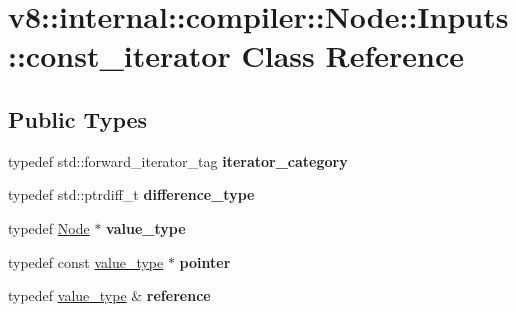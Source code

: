 \hypertarget{classv8_1_1internal_1_1compiler_1_1Node_1_1Inputs_1_1const__iterator}{}\section{v8\+:\+:internal\+:\+:compiler\+:\+:Node\+:\+:Inputs\+:\+:const\+\_\+iterator Class Reference}
\label{classv8_1_1internal_1_1compiler_1_1Node_1_1Inputs_1_1const__iterator}
\subsection*{Public Types}
\begin{DoxyCompactItemize}
\item 
\mbox{\label{classv8_1_1internal_1_1compiler_1_1Node_1_1Inputs_1_1const__iterator_a76e0b1f409d6068bee5c403628a87095}} 
typedef std\+::forward\+\_\+iterator\+\_\+tag {\bfseries iterator\+\_\+category}
\item 
\mbox{\label{classv8_1_1internal_1_1compiler_1_1Node_1_1Inputs_1_1const__iterator_aaa79e84ef5c20000047cb671e9ee5b75}} 
typedef std\+::ptrdiff\+\_\+t {\bfseries difference\+\_\+type}
\item 
\mbox{\label{classv8_1_1internal_1_1compiler_1_1Node_1_1Inputs_1_1const__iterator_a329d627c41e3f33033bebfcbc421dda0}} 
typedef \mbox{\hyperlink{classv8_1_1internal_1_1compiler_1_1Node}{Node}} $\ast$ {\bfseries value\+\_\+type}
\item 
\mbox{\label{classv8_1_1internal_1_1compiler_1_1Node_1_1Inputs_1_1const__iterator_a42c2863ca701aaf7ae07a40de0610761}} 
typedef const \mbox{\hyperlink{classv8_1_1internal_1_1compiler_1_1Node}{value\+\_\+type}} $\ast$ {\bfseries pointer}
\item 
\mbox{\label{classv8_1_1internal_1_1compiler_1_1Node_1_1Inputs_1_1const__iterator_aac1f1498d11bcb3ffa52333447664bb9}} 
typedef \mbox{\hyperlink{classv8_1_1internal_1_1compiler_1_1Node}{value\+\_\+type}} \& {\bfseries reference}
\end{DoxyCompactItemize}
